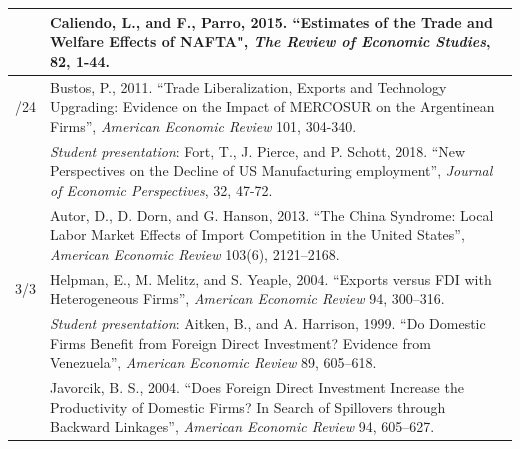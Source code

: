 \documentclass[10pt]{article}
\begin{document}
\begin{table}[h!]
\begin{tabular}{|>{\centering\arraybackslash}p{2.2cm}|>{\raggedright\arraybackslash}p{11.5cm}|}
\cline{2-2}
     & Caliendo, L., and F., Parro, 2015. ``Estimates of the Trade and Welfare Effects of NAFTA", {\it The Review of Economic Studies}, 82, 1-44.\\
\hline
2/24 & Bustos, P., 2011. ``Trade Liberalization, Exports and Technology Upgrading: Evidence on the Impact of MERCOSUR on the Argentinean Firms”, {\it American Economic Review} 101, 304-340.\\
\hline
\multirow{2}{*}{2/26} %
     & \textit{Student presentation}: Fort, T., J. Pierce, and P. Schott, 2018. ``New Perspectives on the Decline of US Manufacturing employment”, {\it Journal of Economic Perspectives}, 32, 47-72. \\
\cline{2-2}
     &  Autor, D., D. Dorn, and G. Hanson, 2013. ``The China Syndrome: Local Labor Market Effects of Import Competition in the United States'', \textit{American Economic Review} 103(6), 2121–2168. \\
\hline
3/3 & Helpman, E., M. Melitz, and S. Yeaple, 2004. ``Exports versus FDI with Heterogeneous Firms'', \textit{American Economic Review} 94, 300–316.\\
\hline
\multirow{2}{*}{3/5} %
     & \textit{Student presentation}: Aitken, B., and A. Harrison, 1999. ``Do Domestic Firms Benefit from Foreign Direct Investment? Evidence from Venezuela'', \textit{American Economic Review} 89, 605–618. \\
\cline{2-2}
     & Javorcik, B. S., 2004. ``Does Foreign Direct Investment Increase the Productivity of Domestic Firms? In Search of Spillovers through Backward Linkages'', \textit{American Economic Review} 94, 605–627. \\
\hline
\end{tabular}
\end{table}
\end{document}
